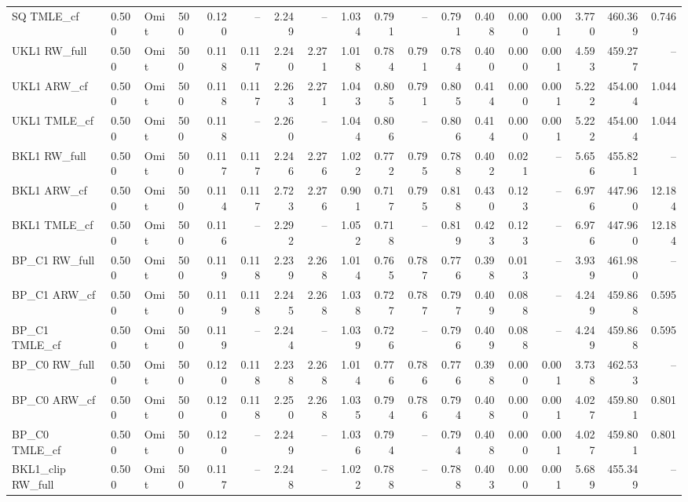 \begin{tabular}{llllrrrrrrrrrrrrrr}
SQ TMLE\_cf & 0.500 & Omit & 500 & 0.120 & -- & 2.249 & -- & 1.034 & 0.791 & -- & 0.791 & 0.408 & 0.000 & 0.001 & 3.770 & 460.369 & 0.746 \\
UKL1 RW\_full & 0.500 & Omit & 500 & 0.118 & 0.117 & 2.240 & 2.271 & 1.018 & 0.784 & 0.791 & 0.784 & 0.400 & 0.000 & 0.001 & 4.593 & 459.277 & -- \\
UKL1 ARW\_cf & 0.500 & Omit & 500 & 0.118 & 0.117 & 2.263 & 2.271 & 1.043 & 0.805 & 0.791 & 0.805 & 0.414 & 0.000 & 0.001 & 5.222 & 454.004 & 1.044 \\
UKL1 TMLE\_cf & 0.500 & Omit & 500 & 0.118 & -- & 2.260 & -- & 1.044 & 0.806 & -- & 0.806 & 0.414 & 0.000 & 0.001 & 5.222 & 454.004 & 1.044 \\
BKL1 RW\_full & 0.500 & Omit & 500 & 0.117 & 0.117 & 2.246 & 2.276 & 1.022 & 0.772 & 0.795 & 0.788 & 0.402 & 0.021 & -- & 5.656 & 455.821 & -- \\
BKL1 ARW\_cf & 0.500 & Omit & 500 & 0.114 & 0.117 & 2.723 & 2.276 & 0.901 & 0.717 & 0.795 & 0.818 & 0.430 & 0.123 & -- & 6.976 & 447.960 & 12.184 \\
BKL1 TMLE\_cf & 0.500 & Omit & 500 & 0.116 & -- & 2.292 & -- & 1.052 & 0.718 & -- & 0.819 & 0.423 & 0.123 & -- & 6.976 & 447.960 & 12.184 \\
BP\_C1 RW\_full & 0.500 & Omit & 500 & 0.119 & 0.118 & 2.239 & 2.268 & 1.014 & 0.765 & 0.787 & 0.776 & 0.398 & 0.013 & -- & 3.939 & 461.980 & -- \\
BP\_C1 ARW\_cf & 0.500 & Omit & 500 & 0.119 & 0.118 & 2.245 & 2.268 & 1.038 & 0.727 & 0.787 & 0.797 & 0.409 & 0.088 & -- & 4.249 & 459.868 & 0.595 \\
BP\_C1 TMLE\_cf & 0.500 & Omit & 500 & 0.119 & -- & 2.244 & -- & 1.039 & 0.726 & -- & 0.796 & 0.409 & 0.088 & -- & 4.249 & 459.868 & 0.595 \\
BP\_C0 RW\_full & 0.500 & Omit & 500 & 0.120 & 0.118 & 2.238 & 2.268 & 1.014 & 0.776 & 0.786 & 0.776 & 0.398 & 0.000 & 0.001 & 3.738 & 462.533 & -- \\
BP\_C0 ARW\_cf & 0.500 & Omit & 500 & 0.120 & 0.118 & 2.250 & 2.268 & 1.035 & 0.794 & 0.786 & 0.794 & 0.408 & 0.000 & 0.001 & 4.027 & 459.801 & 0.801 \\
BP\_C0 TMLE\_cf & 0.500 & Omit & 500 & 0.120 & -- & 2.249 & -- & 1.036 & 0.794 & -- & 0.794 & 0.408 & 0.000 & 0.001 & 4.027 & 459.801 & 0.801 \\
BKL1\_clip RW\_full & 0.500 & Omit & 500 & 0.117 & -- & 2.248 & -- & 1.022 & 0.788 & -- & 0.788 & 0.403 & 0.000 & 0.001 & 5.689 & 455.349 & -- \\

\end{tabular}
